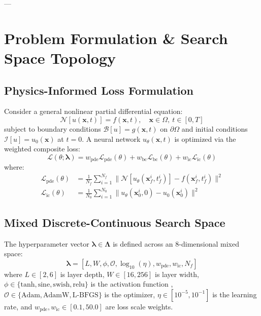 \documentclass[authoryear,preprint,12pt]{elsarticle}
\begin{document}
---

\section{Problem Formulation \& Search Space Topology}
\label{sec:problem_formulation}

\subsection{Physics-Informed Loss Formulation}
Consider a general nonlinear partial differential equation:
\begin{equation}
\mathcal{N}[u(\mathbf{x}, t)] = f(\mathbf{x}, t), \quad \mathbf{x} \in \Omega, \ t \in [0, T]
\end{equation}
subject to boundary conditions $\mathcal{B}[u] = g(\mathbf{x}, t)$ on $\partial \Omega$ and initial conditions $\mathcal{I}[u] = u_0(\mathbf{x})$ at $t=0$. A neural network $u_\theta(\mathbf{x}, t)$ is optimized via the weighted composite loss:
\begin{equation}
\mathcal{L}(\theta; \boldsymbol{\lambda}) = w_{\text{pde}} \mathcal{L}_{\text{pde}}(\theta) + w_{\text{bc}} \mathcal{L}_{\text{bc}}(\theta) + w_{\text{ic}} \mathcal{L}_{\text{ic}}(\theta)
\end{equation}
where:
\begin{align}
\mathcal{L}_{\text{pde}}(\theta) &= \frac{1}{N_f} \sum_{i=1}^{N_f} \|\mathcal{N}[u_\theta(\mathbf{x}_f^i, t_f^i)] - f(\mathbf{x}_f^i, t_f^i)\|^2 \\
\mathcal{L}_{\text{ic}}(\theta) &= \frac{1}{N_0} \sum_{i=1}^{N_0} \|u_\theta(\mathbf{x}_0^i, 0) - u_0(\mathbf{x}_0^i)\|^2
\end{align}

\subsection{Mixed Discrete-Continuous Search Space}
The hyperparameter vector $\boldsymbol{\lambda} \in \boldsymbol{\Lambda}$ is defined across an 8-dimensional mixed space:
\begin{equation}
\boldsymbol{\lambda} = \left[ L, W, \phi, \mathcal{O}, \log_{10}(\eta), w_{\text{pde}}, w_{\text{ic}}, N_f \right]
\end{equation}
where $L \in [2, 6]$ is layer depth, $W \in [16, 256]$ is layer width, $\phi \in \{\text{tanh}, \text{sine}, \text{swish}, \text{relu}\}$ is the activation function \citep{sitzmann2020implicit}, $\mathcal{O} \in \{\text{Adam}, \text{AdamW}, \text{L-BFGS}\}$ is the optimizer, $\eta \in [10^{-5}, 10^{-1}]$ is the learning rate, and $w_{\text{pde}}, w_{\text{ic}} \in [0.1, 50.0]$ are loss scale weights.
\end{document}
